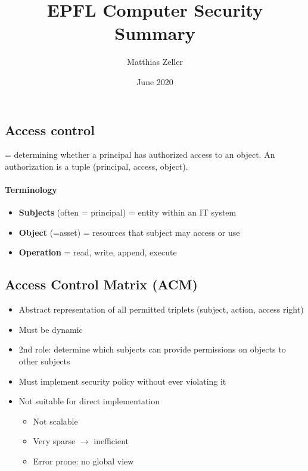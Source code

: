 \documentclass{article}
\title{EPFL Computer Security Summary}
\author{Matthias Zeller}
\date{June 2020}
\newenvironment{myitemize}
{ \begin{itemize}
    \setlength{\itemsep}{005pt}
    \setlength{\parskip}{0pt}
    \setlength{\parsep}{0pt}     }
{ \end{itemize}                  }
\begin{document}
\maketitle

\begin{multicols}{2}
\tableofcontents
\newpage



\section{Access control}

= determining whether a principal has authorized access to an object. An authorization is a tuple (principal, access, object).

\paragraph{Terminology}

\begin{myitemize}
    \item \textbf{Subjects} (often = principal) = entity within an IT system
    \item \textbf{Object} (=asset) = resources that subject may access or use
    \item \textbf{Operation} = read, write, append, execute
\end{myitemize}

\subsection{Access Control Matrix (ACM)}

\begin{myitemize}
    \item Abstract representation of all permitted triplets (subject, action, access right)
    \item Must be dynamic
    \item 2nd role: determine which subjects can provide permissions on objects to other subjects
    \item Must implement security policy without ever violating it
    \item Not suitable for direct implementation
    \begin{myitemize}
        \item Not scalable
        \item Very sparse $\rightarrow$ inefficient
        \item Error prone: no global view
    \end{myitemize}
\end{myitemize}


\end{multicols}
\end{document}
